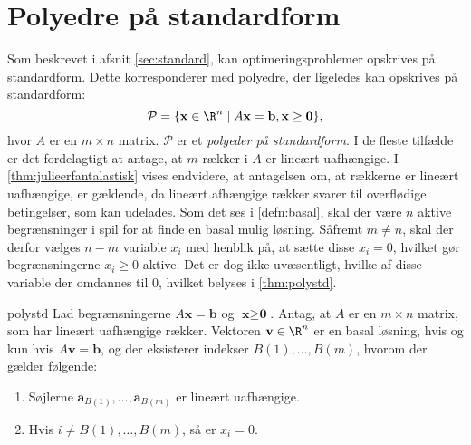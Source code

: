 \section{Polyedre på standardform}
\label{afsnit:fisk}
%
Som beskrevet i afsnit \ref{sec:standard}, kan optimeringsproblemer opskrives på standardform.
Dette korresponderer med polyedre, der ligeledes kan opskrives på standardform: 
$$\mathcal{P}=\{ \mathbf{x} \in \R^n  \mid  A\mathbf{x}=\mathbf{b}, \mathbf{x} \geq \mathbf{0} \},$$ hvor $A$ er en $m \times n$ matrix.
$\mathcal{P}$ er et \textit{polyeder på standardform}.
I de fleste tilfælde er det fordelagtigt at antage, at $m$ rækker i $A$ er lineært uafhængige.
I \ref{thm:julieerfantalastisk} vises endvidere, at antagelsen om, at rækkerne er lineært uafhængige, er gældende, da lineært afhængige rækker svarer til overflødige betingelser, som kan udelades.
Som det ses i \ref{defn:basal}, skal der være $n$ aktive begrænsninger i spil for at finde en basal mulig løsning.
Såfremt $m \neq n$, skal der derfor vælges $n-m$ variable $x_i$ med henblik på, at sætte disse $x_i=0$, hvilket gør begrænsningerne $x_i \geq 0$ aktive.
Det er dog ikke uvæsentligt, hvilke af disse variable der omdannes til $0$, hvilket belyses i \ref{thm:polystd}.
%
\begin{thm}{}{polystd}
Lad begrænsningerne $A\textbf{x}=\mathbf{b}$ og $\textbf{x}\geq \textbf{0}$.
Antag, at $A$ er en $m \times n$ matrix, som har lineært uafhængige rækker.
Vektoren $\textbf{v} \in \R^n$ er en basal løsning, hvis og kun hvis $A\textbf{v}=\mathbf{b}$, og der eksisterer indekser $B(1),\ldots,B(m)$, hvorom der gælder følgende:
\begin{enumerate}[label=(\alph*)]
\item Søjlerne $\mathbf{a}_{B(1)},\ldots,\mathbf{a}_{B(m)}$ er lineært uafhængige.
\item Hvis $i \neq B(1),\ldots, B(m)$, så er $x_i=0$.
\end{enumerate}
\end{thm}

